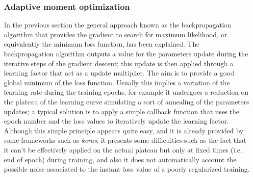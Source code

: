 \subsubsection{Adaptive moment optimization}
In the previous section the general approach known as the backpropagation algorithm that provides the gradient to search for maximum likelihood, or equivalently the minimum loss function, has been explained. 
The backpropagation algorithm outputs a value for the parameters update during the iterative steps of the gradient descent; this update is then applied through a learning factor that act as a update multiplier. The aim is to provide a good global minimum of the loss function.
Usually this implies a variation of the learning rate during the training epochs, for example it undergoes a reduction on the plateau of the learning curve simulating a sort of annealing of the parameters updates; a typical solution is to apply a simple callback function that uses the epoch number and the loss values to iteratively update the learning factor.
Although this simple principle appears quite easy, and it is already provided by some frameworks such as \textit{keras}, it presents some difficulties such as the fact that it can't be effectively applied on the actual plateau but only at fixed times (i.e. end of epoch) during training, and also it does not automatically account the possible noise associated to the instant loss value of a poorly regularized training.

